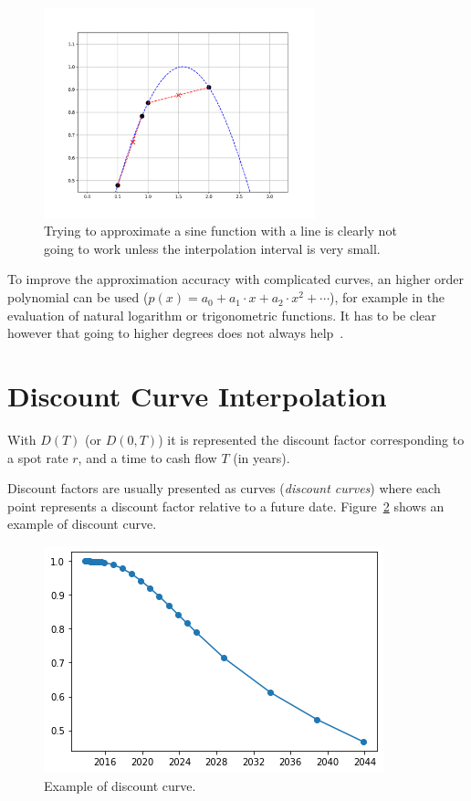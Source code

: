 \begin{figure}
  \centering
  \includegraphics[width=0.7\textwidth]{figures/wrong_interp.png}
  \caption{Trying to approximate a sine function with a line is clearly not going to work unless the interpolation interval is very small.}
  \label{fig:sine_interp}
\end{figure}

To improve the approximation accuracy with complicated curves, an higher order polynomial can be used ($p(x)=a_0 + a_1\cdot x + a_2\cdot x^2+\cdots$), for example in the evaluation of natural logarithm or trigonometric functions. It has to be clear however that going to higher degrees does not always help~\cite{bib:runge}.

\section{Discount Curve Interpolation}
\label{discount-curve-interpolation}
With $D(T)$ (or $D(0,T)$) it is represented the discount factor corresponding to a spot rate $r$, and a time to cash flow $T$ (in years).

Discount factors are usually presented as curves (\emph{discount curves}) where each point represents a discount factor relative to a future date. Figure~\ref{fig:example_discount_curve} shows an example of discount curve.

\begin{figure}[htbp]
    \centering
	\includegraphics[width=0.7\linewidth]{figures/discount_curve}
	\caption{Example of discount curve.}
	\label{fig:example_discount_curve}
\end{figure}

